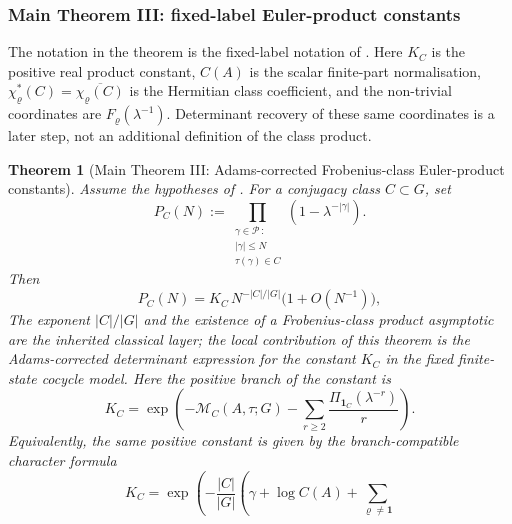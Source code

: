 \documentclass[11pt,a4paper]{amsart}
\theoremstyle{plain}
\newtheorem{theorem}{Theorem}[section]
\theoremstyle{definition}
\theoremstyle{remark}
\newcommand{\cP}{\mathcal P}
\begin{document}
\subsubsection{Main Theorem III: fixed-label Euler-product constants}
\label{subsubsec:main-iii-fixed-label-products}

The notation in the theorem is the fixed-label notation of
.  Here \(K_C\) is the positive
real product constant, \(C(A)\) is the scalar finite-part normalisation,
\(\chi_\varrho^\ast(C)=\overline{\chi_\varrho(C)}\) is the Hermitian class
coefficient, and the non-trivial coordinates are
\(F_\varrho(\lambda^{-1})\).  Determinant recovery of these same coordinates
is a later step, not an additional definition of the class product.

\begin{theorem}[Main Theorem III: Adams-corrected Frobenius-class
  Euler-product constants]
  \label{thm:class-euler-product-mertens}
  Assume the hypotheses of . For a
  conjugacy class \(C\subset G\), set
  \begin{equation}\label{eq:class-euler-product-def}
    P_C(N):=
    \prod_{\substack{\gamma\in\cP\,:\\ |\gamma|\le N\\
      \tau(\gamma)\in C}}
      \left(1-\lambda^{-|\gamma|}\right).
  \end{equation}
  Then
  \begin{equation}\label{eq:class-euler-product-asymptotic}
    P_C(N)=K_C\,N^{-|C|/|G|}\bigl(1+O(N^{-1})\bigr),
  \end{equation}
  The exponent \(|C|/|G|\) and the existence of a Frobenius-class product
  asymptotic are the inherited classical layer; the local contribution of this
  theorem is the Adams-corrected determinant expression for the constant
  \(K_C\) in the fixed finite-state cocycle model.
  Here the positive branch of the constant is
  \begin{equation}\label{eq:class-euler-product-k-mc}
    K_C=
    \exp\!\left(
      -\mathcal M_C(A,\tau;G)
      -\sum_{r\ge2}\frac{\Pi_{\mathbf1_C}(\lambda^{-r})}{r}
    \right).
  \end{equation}
  Equivalently, the same positive constant is given by the branch-compatible
  character formula
  \begin{equation}\label{eq:class-euler-product-k-f}
    K_C=
    \exp\!\left(
      -\frac{|C|}{|G|}
      \left(
        \gamma+\log C(A)
        +\sum_{\varrho\neq\mathbf1}

\end{equation}
\end{theorem}
\end{document}
